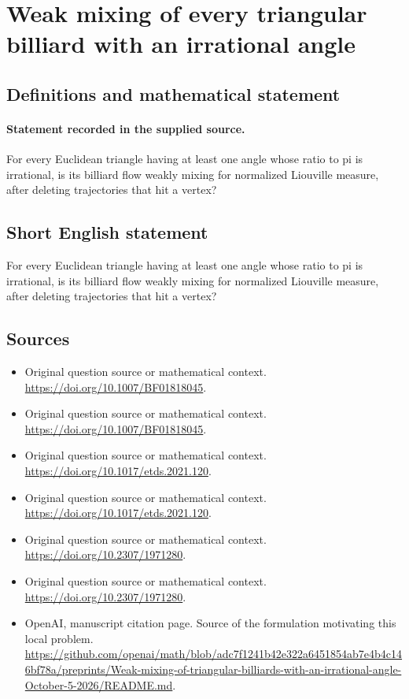 \documentclass[11pt]{article}
\begin{document}
\section*{Weak mixing of every triangular billiard with an irrational angle}\label{statement}
\subsection{Definitions and mathematical statement}
\paragraph{Statement recorded in the supplied source.}
For every Euclidean triangle having at least one angle whose ratio to pi is irrational, is its billiard flow weakly mixing for normalized Liouville measure, after deleting trajectories that hit a vertex?
\subsection{Short English statement}
For every Euclidean triangle having at least one angle whose ratio to pi is irrational, is its billiard flow weakly mixing for normalized Liouville measure, after deleting trajectories that hit a vertex?
\subsection{Sources}
\begin{itemize}
\item[S1] Original question source or mathematical context.
\url{https://doi.org/10.1007/BF01818045}.
\item[S2] Original question source or mathematical context.
\url{https://doi.org/10.1007/BF01818045}.
\item[S3] Original question source or mathematical context.
\url{https://doi.org/10.1017/etds.2021.120}.
\item[S4] Original question source or mathematical context.
\url{https://doi.org/10.1017/etds.2021.120}.
\item[S5] Original question source or mathematical context.
\url{https://doi.org/10.2307/1971280}.
\item[S6] Original question source or mathematical context.
\url{https://doi.org/10.2307/1971280}.
\item[S7] OpenAI, manuscript citation page. Source of the formulation motivating this local problem.
\url{https://github.com/openai/math/blob/adc7f1241b42e322a6451854ab7e4b4c146bf78a/preprints/Weak-mixing-of-triangular-billiards-with-an-irrational-angle-October-5-2026/README.md}.
\end{itemize}
\end{document}
